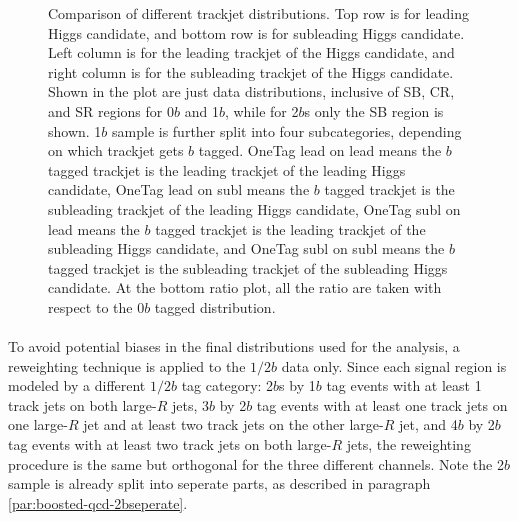 \begin{figure}[htbp!]
\begin{center}
\caption{Comparison of different trackjet \pt distributions. Top row is for leading \pt Higgs candidate, and bottom row is for subleading \pt Higgs candidate. Left column is for the leading \pt trackjet of the Higgs candidate, and right column is for the subleading \pt trackjet of the Higgs candidate. Shown in the plot are just data distributions, inclusive of SB, CR, and SR regions for 0$b$ and 1$b$, while for 2$b$s only the SB region is shown. 1$b$ sample is further split into four subcategories, depending on which trackjet gets $b$ tagged. OneTag lead on lead means the $b$ tagged trackjet is the leading trackjet of the leading Higgs candidate, OneTag lead on subl means the $b$ tagged trackjet is the subleading trackjet of the leading Higgs candidate, OneTag subl on lead means the $b$ tagged trackjet is the leading trackjet of the subleading Higgs candidate, and OneTag subl on subl means the $b$ tagged trackjet is the subleading trackjet of the subleading Higgs candidate. At the bottom ratio plot, all the ratio are taken with respect to the 0$b$ tagged distribution.}
\label{fig:rw-2bs-comp}
\end{center}
\end{figure}

\paragraph{}
To avoid potential biases in the final distributions used for the analysis, a reweighting technique is applied to the $1/2b$ data only. Since each signal region is modeled by a different $1/2b$ tag category: 2$b$s by 1$b$ tag events with at least 1 track jets on both large-$R$ jets, 3$b$ by 2$b$ tag events with at least one track jets on one large-$R$ jet and at least two track jets on the other large-$R$ jet, and 4$b$ by 2$b$ tag events with at least two track jets on both large-$R$ jets, the reweighting procedure is the same but orthogonal for the three different channels. Note the 2$b$ sample is already split into seperate parts, as described in paragraph \ref{par:boosted-qcd-2bseperate}.

\clearpage{}
